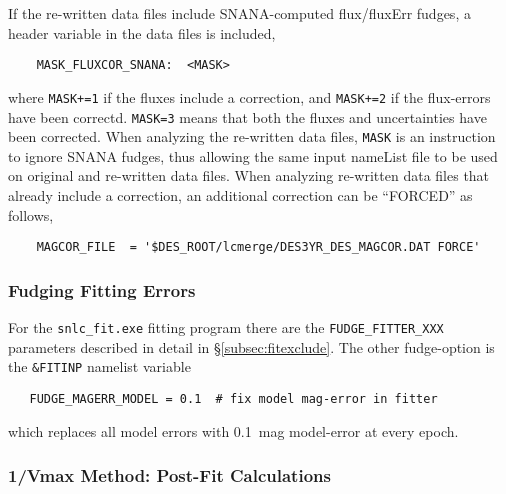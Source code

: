 \documentclass[12pt]{article}
\begin{document}
If the re-written data files include SNANA-computed flux/fluxErr fudges,
a header variable in the data files is included,
\begin{verbatim}
    MASK_FLUXCOR_SNANA:  <MASK>
\end{verbatim}
%
where {\tt MASK+=1} if the fluxes include a correction,
and {\tt MASK+=2} if the flux-errors have been correctd.
{\tt MASK=3} means that both the fluxes and uncertainties have
been corrected. When analyzing the re-written data files,
{\tt MASK} is an instruction to ignore SNANA fudges, thus
allowing the same input nameList file to be used on original
and re-written data files. When analyzing re-written data files
that already include a correction, an additional correction 
can be ``FORCED'' as follows,
%
\begin{verbatim}
    MAGCOR_FILE  = '$DES_ROOT/lcmerge/DES3YR_DES_MAGCOR.DAT FORCE'
\end{verbatim}

  \subsubsection{Fudging Fitting Errors}
  \label{sss:fudge_fit_errors}


For the {\tt snlc\_fit.exe} fitting program there are the 
{\tt FUDGE\_FITTER\_XXX} parameters described in detail in 
\S\ref{subsec:fitexclude}.
The other fudge-option is the {\tt \&FITINP} namelist  variable
\begin{verbatim}
   FUDGE_MAGERR_MODEL = 0.1  # fix model mag-error in fitter
\end{verbatim}
%
which replaces all model errors  with 0.1~mag model-error
at every epoch.



 \clearpage
  \subsubsection{1/Vmax Method: Post-Fit Calculations}
  \label{sss:Vmax}
\end{document}
